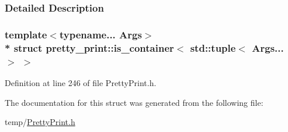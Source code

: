\subsubsection{Detailed Description}
\subsubsection*{template$<$typename... Args$>$\\*
struct pretty\+\_\+print\+::is\+\_\+container$<$ std\+::tuple$<$ Args... $>$ $>$}



Definition at line 246 of file Pretty\+Print.\+h.



The documentation for this struct was generated from the following file\+:\begin{DoxyCompactItemize}
\item 
temp/\hyperlink{PrettyPrint_8h}{Pretty\+Print.\+h}\end{DoxyCompactItemize}
